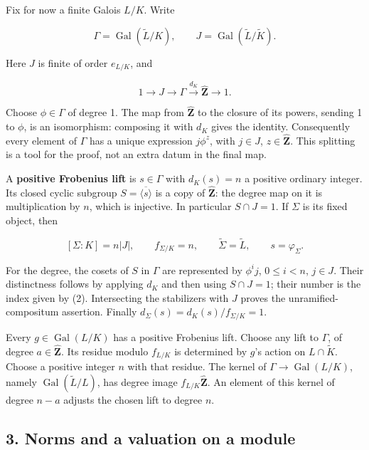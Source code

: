 \documentclass[11pt,a4paper]{article}
\begin{document}
Fix for now a finite Galois \(L/K\). Write

\[
\Gamma=\operatorname{Gal}(\widetilde L/K),\qquad
J=\operatorname{Gal}(\widetilde L/\widetilde K).
\]

Here \(J\) is finite of order \(e_{L/K}\), and

\[
1\longrightarrow J\longrightarrow\Gamma
\xrightarrow{d_K}\widehat{\mathbf Z}\longrightarrow1.
\tag{2}
\]

Choose \(\phi\in\Gamma\) of degree 1. The map from
\(\widehat{\mathbf Z}\) to the closure of its powers, sending 1 to
\(\phi\), is an isomorphism: composing it with \(d_K\) gives the
identity. Consequently every element of \(\Gamma\) has a unique
expression \(j\phi^z\), with \(j\in J\), \(z\in\widehat{\mathbf Z}\).
This splitting is a tool for the proof, not an extra datum in the final
map.

A \textbf{positive Frobenius lift} is \(s\in\Gamma\) with \(d_K(s)=n\) a
positive ordinary integer. Its closed cyclic subgroup
\(S=\overline{\langle s\rangle}\) is a copy of \(\widehat{\mathbf Z}\):
the degree map on it is multiplication by \(n\), which is injective. In
particular \(S\cap J=1\). If \(\Sigma\) is its fixed object, then

\[
[\Sigma:K]=n|J|,\qquad f_{\Sigma/K}=n,
\qquad\widetilde\Sigma=\widetilde L,
\qquad s=\varphi_\Sigma.
\tag{3}
\]

For the degree, the cosets of \(S\) in \(\Gamma\) are represented by
\(\phi^i j\), \(0\leq i<n\), \(j\in J\). Their distinctness follows by
applying \(d_K\) and then using \(S\cap J=1\); their number is the index
given by (2). Intersecting the stabilizers with \(J\) proves the
unramified-compositum assertion. Finally
\(d_\Sigma(s)=d_K(s)/f_{\Sigma/K}=1\).

Every \(g\in\operatorname{Gal}(L/K)\) has a positive Frobenius lift.
Choose any lift to \(\Gamma\), of degree \(a\in\widehat{\mathbf Z}\).
Its residue modulo \(f_{L/K}\) is determined by \(g\)'s action on
\(L\cap\widetilde K\). Choose a positive integer \(n\) with that
residue. The kernel of \(\Gamma\to\operatorname{Gal}(L/K)\), namely
\(\operatorname{Gal}(\widetilde L/L)\), has degree image
\(f_{L/K}\widehat{\mathbf Z}\). An element of this kernel of degree
\(n-a\) adjusts the chosen lift to degree \(n\).

\subsection{3. Norms and a valuation on a
module}\label{norms-and-a-valuation-on-a-module}
\end{document}
